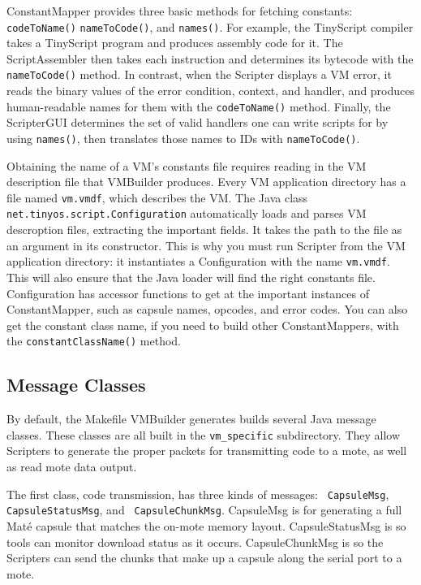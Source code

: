\documentclass[12pt]{article}
\newcommand{\mate}{Mat\'{e}\xspace}
\begin{document}
ConstantMapper provides three basic methods for fetching constants:
{\tt codeToName()} {\tt nameToCode()}, and {\tt names()}. For example,
the TinyScript compiler takes a TinyScript program and produces
assembly code for it. The ScriptAssembler then takes each instruction
and determines its bytecode with the {\tt nameToCode()} method. In
contrast, when the Scripter displays a VM error, it reads the binary
values of the error condition, context, and handler, and produces
human-readable names for them with the {\tt codeToName()}
method. Finally, the ScripterGUI determines the set of valid handlers
one can write scripts for by using {\tt names()}, then translates
those names to IDs with {\tt nameToCode()}.

Obtaining the name of a VM's constants file requires reading in the VM
description file that VMBuilder produces. Every VM application
directory has a file named {\tt vm.vmdf}, which describes the VM. The
Java class {\tt net.tinyos.script.Configuration} automatically loads
and parses VM descroption files, extracting the important fields. It
takes the path to the file as an argument in its constructor. This is
why you must run Scripter from the VM application directory: it
instantiates a Configuration with the name {\tt vm.vmdf}. This will
also ensure that the Java loader will find the right constants
file. Configuration has accessor functions to get at the important
instances of ConstantMapper, such as capsule names, opcodes, and error
codes. You can also get the constant class name, if you need to build
other ConstantMappers, with the {\tt constantClassName()} method.


\subsection{Message Classes}

By default, the Makefile VMBuilder generates builds several Java
message classes. These classes are all built in the {\tt vm\_specific}
subdirectory. They allow Scripters to generate the proper packets for
transmitting code to a mote, as well as read mote data output.

The first class, code transmission, has three kinds of messages: {\tt
CapsuleMsg}, {\tt CapsuleStatusMsg}, and {\tt
CapsuleChunkMsg}. CapsuleMsg is for generating a full \mate capsule
that matches the on-mote memory layout. CapsuleStatusMsg is so tools
can monitor download status as it occurs. CapsuleChunkMsg is so the
Scripters can send the chunks that make up a capsule along the serial
port to a mote.
\end{document}
